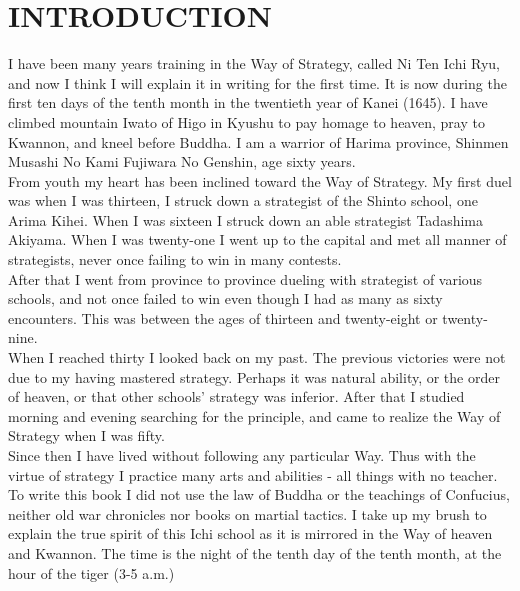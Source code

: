 \chapter{\hspace{1.4em}INTRODUCTION}

I have been many years training in the Way of Strategy, called Ni Ten Ichi Ryu, and now I think I will explain it in writing for the first time. It is now during the first ten days of the tenth month in the twentieth year of Kanei (1645). I have climbed mountain Iwato of Higo in Kyushu to pay homage to heaven, pray to Kwannon, and kneel before Buddha. I am a warrior of Harima province, Shinmen Musashi No Kami Fujiwara No Genshin, age sixty years.\\

From youth my heart has been inclined toward the Way of Strategy. My first duel was when I was thirteen, I struck down a strategist of the Shinto school, one Arima Kihei. When I was sixteen I struck down an able strategist Tadashima Akiyama. When I was twenty-one I went up to the capital and met all manner of strategists, never once failing to win in many contests.\\

After that I went from province to province dueling with strategist of various schools, and not once failed to win even though I had as many as sixty encounters. This was between the ages of thirteen and twenty-eight or twenty-nine.\\

When I reached thirty I looked back on my past. The previous victories were not due to my having mastered strategy. Perhaps it was natural ability, or the order of heaven, or that other schools' strategy was inferior. After that I studied morning and evening searching for the principle, and came to realize the Way of Strategy when I was fifty.\\

Since then I have lived without following any particular Way. Thus with the virtue of strategy I practice many arts and abilities - all things with no teacher. To write this book I did not use the law of Buddha or the teachings of Confucius, neither old war chronicles nor books on martial tactics. I take up my brush to explain the true spirit of this Ichi school as it is mirrored in the Way of heaven and Kwannon. The time is the night of the tenth day of the tenth month, at the hour of the tiger (3-5 a.m.)
